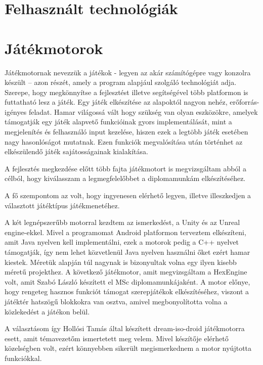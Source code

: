 \section{Felhasznált technológiák}
\label{felhtechnologia}

\section*{Játékmotorok}
\label{jatekmotor}

Játékmotornak nevezzük a játékok - legyen az akár számítógépre vagy konzolra készült – azon részét, amely a program alapjául szolgáló technológiát adja. 
Szerepe, hogy megkönnyítse a fejlesztést illetve segítségével több platformon is futtatható lesz a játék.
Egy játék elkészítése az alapoktól nagyon nehéz, erőforrás-igényes feladat. 
Hamar világossá vált hogy szükség van olyan eszközökre, amelyek támogatják egy játék alapvető funkcióinak gyors implementálását, mint a megjelenítés és felhasználó input kezelése, hiszen ezek a legtöbb játék esetében nagy hasonlóságot mutatnak. 
Ezen funkciók megvalósítása után történhet az elkészülendő játék sajátosságainak kialakítása.
 
A fejlesztés megkezdése előtt több fajta játékmotort is megvizsgáltam abból a célból, hogy kiválasszam a legmegfelelőbbet a diplomamunkám elkészítéséhez. 

A fő szempontom az volt, hogy ingyenesen elérhető legyen, illetve illeszkedjen a választott játéktípus játékmenetéhez.

A két legnépszerűbb motorral kezdtem az ismerkedést, a Unity és az Unreal engine-ekkel. 
Mivel a programomat Android platformon terveztem elkészíteni, amit Java nyelven kell implementálni, ezek a motorok pedig a C++ nyelvet támogatják, így nem lehet közvetlenül Java nyelven használni őket ezért hamar kiestek. 
Méretük alapján túl nagynak is bizonyultak volna egy ilyen kisebb méretű projekthez. 
A következő játékmotor, amit megvizsgáltam a HexEngine volt, amit Szabó László készített el MSc diplomamunkájaként. 
A motor előnye, hogy rengeteg hasznos funkciót támogat szerepjátékok elkészítéséhez, viszont a játéktér hatszögű blokkokra van osztva, amivel megbonyolította volna a közlekedést a játékon belül.

A választásom így Hollósi Tamás által készített dream-iso-droid játékmotorra esett, amit témavezetőm ismertetett meg velem. 
Mivel készítője elérhető közelségben volt, ezért könnyebben sikerült megismerkednem a motor nyújtotta funkciókkal.

